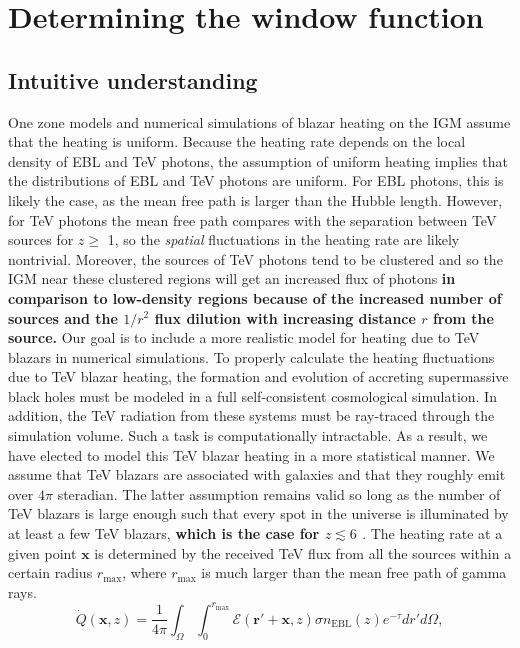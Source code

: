 \documentclass[twocolumns]{emulateapj}
\newcommand\Cc[1]{{\color{blue} \bf #1}} %
\begin{document}
\section {Determining the window function}\label{window}
\subsection{Intuitive understanding}
One zone models \citep{2012ApJ...752...23C,2012ApJ...752...24P} and numerical simulations \citep{2012MNRAS.423..149P} of blazar heating on the IGM assume that the heating is uniform. Because the heating rate depends on the local density of EBL and TeV photons, the assumption of uniform heating implies that the distributions of EBL and TeV photons are uniform. For EBL photons, this is likely the case, as the mean free path is larger than the Hubble length. However, for TeV photons the mean free path compares with the separation between TeV sources for $z\geqslant$ 1, so the {\it spatial} fluctuations in the heating rate are likely nontrivial. Moreover, the sources of TeV photons tend to be clustered and so the IGM near these clustered regions will get an increased flux of photons \Cc{in comparison to low-density regions because of the increased number of sources and the $1/r^2$ flux dilution with increasing distance $r$ from the source.}
Our goal is to include a more realistic model for heating due to TeV blazars in numerical simulations.
To properly calculate the heating fluctuations due to TeV blazar heating, the formation and evolution of accreting supermassive black holes must be modeled in a full self-consistent cosmological simulation. In addition, the TeV radiation from these systems must be ray-traced through the simulation volume. Such a task is computationally intractable. As a result, we have elected to model this TeV blazar heating in a more statistical manner.
We assume that TeV blazars are associated with galaxies and that they roughly emit over $4\pi$ steradian. The latter assumption remains valid so long as the number of TeV blazars is large enough such that every spot in the universe is illuminated by at least a few TeV blazars, \Cc{which is the case for $z\lesssim 6$ \citep{2012ApJ...752...23C}}.
The heating rate at a given point $\mathbf{x}$ is determined by the received TeV flux from all the sources within a certain radius $r_{\mathrm{max}}$, where $r_{\mathrm{max}}$ is much larger than the mean free path of gamma rays.
\begin{equation}
\label{eq:heating_rate}
\dot{Q}(\mathbf{x},z)= \frac{1}{4\pi} \int_{\Omega}\int_0^{r_{\mathrm{max}}} \mathcal{E}(\mathbf{r}'+\mathbf{x},z)\sigma n_{\mathrm{EBL}}(z) e^{-\tau}dr' d\Omega,
\end{equation}
\end{document}
